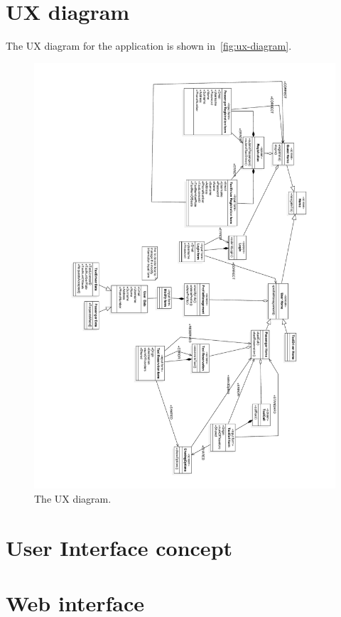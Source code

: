 \section{UX diagram}

The UX diagram for the application is shown in~\autoref{fig:ux-diagram}.
\begin{figure}
\centering
\includegraphics[width=\textwidth]{diagrams/UXdiagramSE2}
\caption{The UX diagram.}
\label{fig:ux-diagram}
\end{figure}

\section{User Interface concept}

\section{Web interface}

